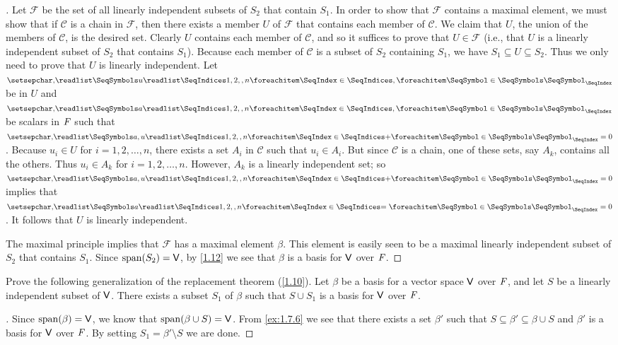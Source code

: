 \begin{proof}[]
  Let \(\mathcal{F}\) be the set of all linearly independent subsets of \(S_2\) that contain \(S_1\).
  In order to show that \(\mathcal{F}\) contains a maximal element, we must show that if \(\mathcal{C}\) is a chain in \(\mathcal{F}\), then there exists a member \(U\) of \(\mathcal{F}\) that contains each member of \(\mathcal{C}\).
  We claim that \(U\), the union of the members of \(\mathcal{C}\), is the desired set.
  Clearly \(U\) contains each member of \(\mathcal{C}\), and so it suffices to prove that \(U \in \mathcal{F}\)
  (i.e., that \(U\) is a linearly independent subset of \(S_2\) that contains \(S_1\)).
  Because each member of \(\mathcal{C}\) is a subset of \(S_2\) containing \(S_1\), we have \(S_1 \subseteq U \subseteq S_2\).
  Thus we only need to prove that \(U\) is linearly independent.
  Let \(\seq{u}{1,2,,n}\) be in \(U\) and \(\seq{a}{1,2,,n}\) be scalars in \(\mathit{F}\) such that \(\seq[+]{a,u}{1,2,,n} = 0\).
  Because \(u_i \in U\) for \(i = 1, 2, \dots, n\), there exists a set \(A_i\) in \(\mathcal{C}\) such that \(u_i \in A_i\).
  But since \(\mathcal{C}\) is a chain, one of these sets, say \(A_k\), contains all the others.
  Thus \(u_i \in A_k\) for \(i = 1, 2, \dots, n\).
  However, \(A_k\) is a linearly independent set;
  so \(\seq[+]{a,u}{1,2,,n} = 0\) implies that \(\seq[=]{a}{1,2,,n} = 0\).
  It follows that \(U\) is linearly independent.

  The maximal principle implies that \(\mathcal{F}\) has a maximal element \(\beta\).
  This element is easily seen to be a maximal linearly independent subset of \(S_2\) that contains \(S_1\).
  Since \(\spn{S_2} = \V\), by \cref{1.12} we see that \(\beta\) is a basis for \(\mathsf{V}\) over \(\mathit{F}\).
\end{proof}

\begin{ex}\label{ex:1.7.7}
  Prove the following generalization of the replacement theorem (\cref{1.10}).
  Let \(\beta\) be a basis for a vector space \(\mathsf{V}\) over \(\mathit{F}\), and let \(S\) be a linearly independent subset of \(\mathsf{V}\).
  There exists a subset \(S_1\) of \(\beta\) such that \(S \cup S_1\) is a basis for \(\mathsf{V}\) over \(\mathit{F}\).
\end{ex}

\begin{proof}[]
  Since \(\spn{\beta} = \V\), we know that \(\spn{\beta \cup S} = \V\).
  From \cref{ex:1.7.6} we see that there exists a set \(\beta'\) such that \(S \subseteq \beta' \subseteq \beta \cup S\) and \(\beta'\) is a basis for \(\mathsf{V}\) over \(\mathit{F}\).
  By setting \(S_1 = \beta' \setminus S\) we are done.
\end{proof}
